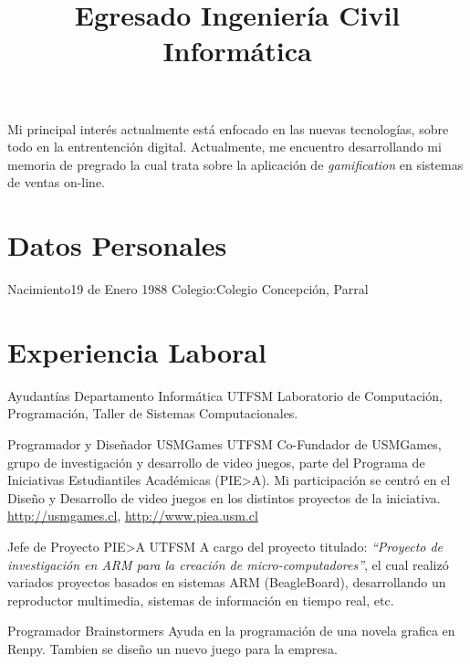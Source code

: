\documentclass[a4paper,10pt]{moderncv}
\title{Egresado Ingeniería Civil Informática}               %
\begin{document}
\maketitle
\vspace{-30pt}
\begin{center}
    Mi principal interés actualmente está enfocado en las nuevas tecnologías,
    sobre todo en la entrentención digital.
    Actualmente, me encuentro desarrollando mi memoria de pregrado la cual trata
    sobre la aplicación de \emph{gamification} en sistemas de ventas on-line.
 \end{center}
\section{Datos Personales}
           {Nacimiento}{19 de Enero 1988}
           {Colegio:}{Colegio Concepción, Parral}
           {}{}

\section{Experiencia Laboral}

        {Ayudantías}
        {Departamento Informática}
        {UTFSM}
        {}
        {Laboratorio de Computación, Programación, Taller de Sistemas Computacionales.}

        {Programador y Diseñador}
        {USMGames}
        {UTFSM}
        {Co-Fundador de USMGames, grupo de investigación y desarrollo de video
        juegos, parte del Programa de Iniciativas Estudiantiles Académicas (PIE>A).
        Mi participación se centró en el Diseño y Desarrollo de video juegos
        en los distintos proyectos de la iniciativa.}
        {\url{http://usmgames.cl}, \url{http://www.piea.usm.cl}}

        {Jefe de Proyecto}
        {PIE>A}
        {UTFSM}
        {}
        {A cargo del proyecto titulado: \emph{``Proyecto de investigación en ARM
        para la creación de micro-computadores''}, el cual realizó variados
        proyectos basados en sistemas ARM (BeagleBoard), desarrollando un
        reproductor multimedia, sistemas de información en tiempo real, etc.}

        {Programador}
        {Brainstormers}
        {}
	{}
        {Ayuda en la programación de una novela grafica en Renpy. Tambien se diseño
	un nuevo juego para la empresa.}
\end{document}
